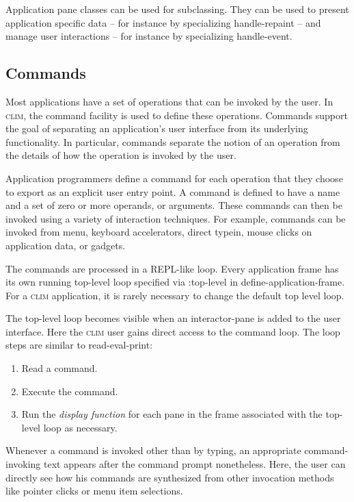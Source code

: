 \documentclass[twocolumn,a4paper]{article}
\newcommand {\concept} [1] {{\sl #1}\index{#1}}
\newcommand {\code}[1]{{\sffamily #1}}
\newcommand {\CLIM}{\textsc{clim}}
\let\method\code
\let\keyword\code
\begin{document}
Application pane classes can be used for subclassing. They can be used
to present application specific data -- for instance by specializing
\method{handle-repaint} -- and manage user interactions -- for
instance by specializing \method{handle-event}.

\subsection{Commands}

Most applications have a set of operations that can be invoked by the
user. In \CLIM{}, the command facility is used to define these
operations. Commands support the goal of separating an application's
user interface from its underlying functionality.  In particular,
commands separate the notion of an operation from the details of how
the operation is invoked by the user.

Application programmers define a command for each operation that they
choose to export as an explicit user entry point. A command is defined
to have a name and a set of zero or more operands, or arguments. These
commands can then be invoked using a variety of interaction
techniques. For example, commands can be invoked from menu, keyboard
accelerators, direct typein, mouse clicks on application data, or
gadgets.

The commands are processed in a REPL-like loop. Every application
frame has its own running top-level loop specified via
\keyword{:top-level} in \method{define-application-frame}. For a
\CLIM{} application, it is rarely necessary to change the default top
level loop.

The top-level loop becomes visible when an interactor-pane is added to
the user interface. Here the \CLIM{} user gains direct access to the
command loop. The loop steps are similar to read-eval-print:

\begin{enumerate}
\item Read a command.
\item Execute the command.
\item Run the \concept{display function} for each pane in the frame
associated with the top-level loop as necessary.
\end{enumerate}

Whenever a command is invoked other than by typing, an appropriate
command-invoking text appears after the command prompt
nonetheless. Here, the user can directly see how his commands are
synthesized from other invocation methods like pointer clicks or menu
item selections.
\end{document}
